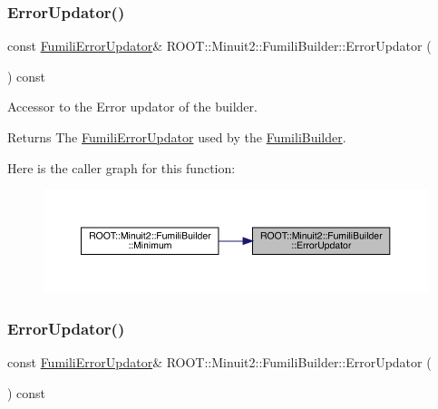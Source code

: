 \subsubsection{\texorpdfstring{ErrorUpdator()}{ErrorUpdator()}\hspace{0.1cm}{\footnotesize\ttfamily [1/2]}}
{\footnotesize\ttfamily const \mbox{\hyperlink{classROOT_1_1Minuit2_1_1FumiliErrorUpdator}{Fumili\+Error\+Updator}}\& R\+O\+O\+T\+::\+Minuit2\+::\+Fumili\+Builder\+::\+Error\+Updator (\begin{DoxyParamCaption}{ }\end{DoxyParamCaption}) const\hspace{0.3cm}{\ttfamily [inline]}}

Accessor to the Error updator of the builder.

\begin{DoxyReturn}{Returns}
The \mbox{\hyperlink{classROOT_1_1Minuit2_1_1FumiliErrorUpdator}{Fumili\+Error\+Updator}} used by the \mbox{\hyperlink{classROOT_1_1Minuit2_1_1FumiliBuilder}{Fumili\+Builder}}. 
\end{DoxyReturn}
Here is the caller graph for this function\+:\nopagebreak
\begin{figure}[H]
\begin{center}
\leavevmode
\includegraphics[width=350pt]{dc/dcb/classROOT_1_1Minuit2_1_1FumiliBuilder_a03face0b120b333aea0b49d5531518ef_icgraph}
\end{center}
\end{figure}
\mbox{\label{classROOT_1_1Minuit2_1_1FumiliBuilder_a03face0b120b333aea0b49d5531518ef}} 
\subsubsection{\texorpdfstring{ErrorUpdator()}{ErrorUpdator()}\hspace{0.1cm}{\footnotesize\ttfamily [2/2]}}
{\footnotesize\ttfamily const \mbox{\hyperlink{classROOT_1_1Minuit2_1_1FumiliErrorUpdator}{Fumili\+Error\+Updator}}\& R\+O\+O\+T\+::\+Minuit2\+::\+Fumili\+Builder\+::\+Error\+Updator (\begin{DoxyParamCaption}{ }\end{DoxyParamCaption}) const\hspace{0.3cm}{\ttfamily [inline]}}

